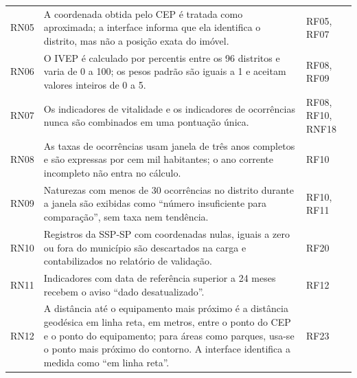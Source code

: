 \begin{longtable}{C{1.2cm}L{10.6cm}L{2.6cm}}
	RN05        & A coordenada obtida pelo CEP é tratada como aproximada; a interface informa que ela identifica o distrito, mas não a posição exata do imóvel.                                                                                                                         & RF05, RF07             \\
	RN06        & O IVEP é calculado por percentis entre os 96 distritos e varia de 0 a 100; os pesos padrão são iguais a 1 e aceitam valores inteiros de 0 a 5.                                                                                                                        & RF08, RF09             \\
	RN07        & Os indicadores de vitalidade e os indicadores de ocorrências nunca são combinados em uma pontuação única.                                                                                                                                                             & RF08, RF10, RNF18      \\
	RN08        & As taxas de ocorrências usam janela de três anos completos e são expressas por cem mil habitantes; o ano corrente incompleto não entra no cálculo.                                                                                                                    & RF10                   \\
	RN09        & Naturezas com menos de 30 ocorrências no distrito durante a janela são exibidas como ``número insuficiente para comparação'', sem taxa nem tendência.                                                                                                                 & RF10, RF11             \\
	RN10        & Registros da SSP-SP com coordenadas nulas, iguais a zero ou fora do município são descartados na carga e contabilizados no relatório de validação.                                                                                                                    & RF20                   \\
	RN11        & Indicadores com data de referência superior a 24 meses recebem o aviso ``dado desatualizado''.                                                                                                                                                                        & RF12                   \\
	RN12        & A distância até o equipamento mais próximo é a distância geodésica em linha reta, em metros, entre o ponto do CEP e o ponto do equipamento; para áreas como parques, usa-se o ponto mais próximo do contorno. A interface identifica a medida como ``em linha reta''. & RF23                   \\

\end{longtable}
